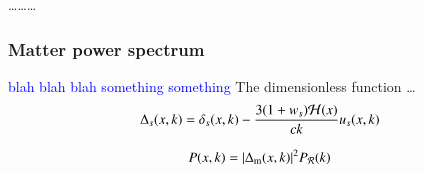     \dots \dots \dots

    



\subsubsection{Matter power spectrum}
    \textcolor{blue}{blah blah blah something something}
    The dimensionless function \dots
    \begin{equation}\label{mil4:theo:eq:Delta_s_of_x_k}
        \Delta_s (x,k) = \delta_s(x,k) - \frac{3(1+w_s)\mathcal{H}(x)}{ck}u_s(x,k)
    \end{equation}

    \begin{equation}\label{mil4:theo:eq:matter_power_spectrum}
        P(x,k) = \abs{\Delta_\mathrm{m}(x,k)}^2 P_\mathcal{R}(k)
    \end{equation}


    